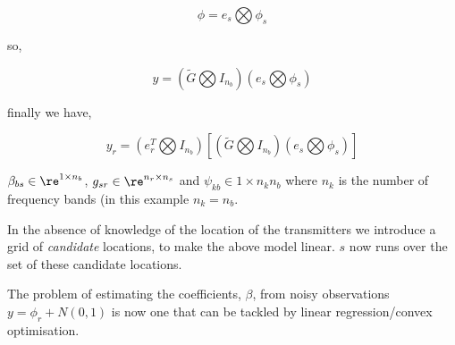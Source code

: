 \begin{equation}
\phi = e_s \bigotimes \phi_s
\end{equation}

so,

\begin{equation}
y = \left( \tilde{G} \bigotimes I_{n_b} \right) \left(e_s \bigotimes \phi_s \right)
\end{equation}

finally we have,

\begin{equation}
y_r = \left(	e_r^T \bigotimes I_{n_b}\right)\left[\left( \tilde{G} \bigotimes I_{n_b} \right) \left(e_s \bigotimes \phi_s \right)\right]
\end{equation}

\(\beta_{bs} \in \re^{1 \times n_b}\), \(g_{sr} \in \re^{n_r \times n_s}\) and \(\psi_{kb} \in 1 \times n_k n_b\) where \(n_k\) is the number of frequency bands (in this example \(n_k = n_b\).

In the absence of knowledge of the location of the transmitters we introduce a grid of \textit{candidate} locations, to make the above model linear. \(s\) now runs over the set of these candidate locations.

The problem of estimating the coefficients, \(\beta\), from noisy observations \(y = \phi_r + N\left(0,1\right)\) is now one that can be tackled by linear regression/convex optimisation.

